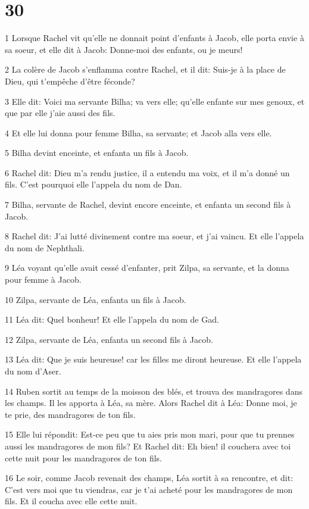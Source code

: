 \chapter{30}

\par 1 Lorsque Rachel vit qu'elle ne donnait point d'enfants à Jacob, elle porta envie à sa soeur, et elle dit à Jacob: Donne-moi des enfants, ou je meurs!
\par 2 La colère de Jacob s'enflamma contre Rachel, et il dit: Suis-je à la place de Dieu, qui t'empêche d'être féconde?
\par 3 Elle dit: Voici ma servante Bilha; va vers elle; qu'elle enfante sur mes genoux, et que par elle j'aie aussi des fils.
\par 4 Et elle lui donna pour femme Bilha, sa servante; et Jacob alla vers elle.
\par 5 Bilha devint enceinte, et enfanta un fils à Jacob.
\par 6 Rachel dit: Dieu m'a rendu justice, il a entendu ma voix, et il m'a donné un fils. C'est pourquoi elle l'appela du nom de Dan.
\par 7 Bilha, servante de Rachel, devint encore enceinte, et enfanta un second fils à Jacob.
\par 8 Rachel dit: J'ai lutté divinement contre ma soeur, et j'ai vaincu. Et elle l'appela du nom de Nephthali.
\par 9 Léa voyant qu'elle avait cessé d'enfanter, prit Zilpa, sa servante, et la donna pour femme à Jacob.
\par 10 Zilpa, servante de Léa, enfanta un fils à Jacob.
\par 11 Léa dit: Quel bonheur! Et elle l'appela du nom de Gad.
\par 12 Zilpa, servante de Léa, enfanta un second fils à Jacob.
\par 13 Léa dit: Que je suis heureuse! car les filles me diront heureuse. Et elle l'appela du nom d'Aser.
\par 14 Ruben sortit au temps de la moisson des blés, et trouva des mandragores dans les champs. Il les apporta à Léa, sa mère. Alors Rachel dit à Léa: Donne moi, je te prie, des mandragores de ton fils.
\par 15 Elle lui répondit: Est-ce peu que tu aies pris mon mari, pour que tu prennes aussi les mandragores de mon fils? Et Rachel dit: Eh bien! il couchera avec toi cette nuit pour les mandragores de ton fils.
\par 16 Le soir, comme Jacob revenait des champs, Léa sortit à sa rencontre, et dit: C'est vers moi que tu viendras, car je t'ai acheté pour les mandragores de mon fils. Et il coucha avec elle cette nuit.
